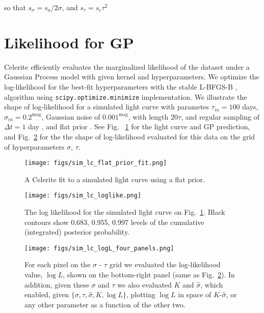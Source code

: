 \documentclass[fleqn,usenatbib]{mnras}  %
\begin{document}
so that $s_{\sigma} = s_{a} / 2 \sigma$, and $s_{\tau} = s_{c} \tau^{2}$





\section{Likelihood for GP}
Celerite efficiently evaluates the marginalized likelihood of the dataset under a Gaussian Process model with given kernel and hyperparameters. We optimize the  log-likelihood  for the best-fit hyperparameters with the stable   L-BFGS-B  \citep{lu1995}, \citep{zhu1997}  algorithm   using  \verb|scipy.optimize.minimize| \citep{jones2001} implementation.  We illustrate the shape of log-likelihood for a simulated light curve with parametes  {$\tau_{in}=100$ days, $\sigma_{in} = 0.2^{\mathrm{mag}}$, Gaussian noise of $0.001^{\mathrm{mag}}$, with length $20 \tau$, and regular sampling of $\Delta t = 1 $ day  }, and flat prior . See   Fig. ~\ref{fig:lc_logL_fit}  for the light curve and GP prediction, and Fig.~\ref{fig:lc_logL} for the the shape of log-likelihood evaluated for this data on the grid of hyperparameters $\sigma$, $\tau$. 

\begin{figure}
\texttt{[image: figs/sim\_lc\_flat\_prior\_fit.png]}
\caption{A Celerite fit to a simulated light curve using a flat prior. }
\label{fig:lc_logL_fit}
\end{figure} 

\begin{figure}
\texttt{[image: figs/sim\_lc\_loglike.png]}
\caption{The log likelihood for the simulated light curve on Fig.~\ref{fig:lc_logL_fit}. Black contours show 0.683, 0.955, 0.997 levels of the cumulative (integrated) posterior probability. }
\label{fig:lc_logL}
\end{figure} 





\begin{figure*}
\texttt{[image: figs/sim\_lc\_logL\_four\_panels.png]}
\caption{For each pixel on the  $\sigma$ - $\tau$ grid we evaluated the log-likelihood value, $\log{L}$, shown on the bottom-right panel (same as Fig.~\ref{fig:lc_logL}). In addition, given these  $\sigma$ and $\tau$ we also evaluated $K$ and $\hat{\sigma}$, which enabled, given $\{ \sigma, \tau, \hat{\sigma}, K, \log{L} \}$, plotting $\log{L}$ in space of $K$-$\hat{\sigma}$, or any other parameter as a function of the other two. }
\label{fig:lc_logL_panels}
\end{figure*} 
\end{document}
